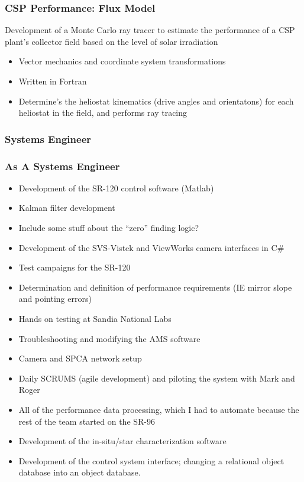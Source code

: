\documentclass[aspectratio=169]{beamer}
\begin{document}
\begin{frame}
  \frametitle{CSP Performance: Flux Model}
  Development of a Monte Carlo ray tracer to estimate the performance
  of a CSP plant's collector field based on the level of solar
  irradiation

  \begin{itemize}
  \item Vector mechanics and coordinate system transformations
  \item Written in Fortran
  \item Determine's the heliostat kinematics (drive angles and orientatons) for each heliostat in the field, and performs ray tracing
  \end{itemize}  
\end{frame}

\subsubsection{Systems Engineer}
\begin{frame}
  \frametitle{As A Systems Engineer}
  \begin{itemize}
  \item Development of the SR-120 control software (Matlab)
  \item Kalman filter development
  \item Include some stuff about the ``zero'' finding logic?
  \item Development of the SVS-Vistek and ViewWorks camera interfaces
    in C\#
  \item Test campaigns for the SR-120
  \item Determination and definition of performance requirements (IE
    mirror slope and pointing errors)
  \item Hands on testing at Sandia National Labs
  \item Troubleshooting and modifying the AMS software
  \item Camera and SPCA network setup
  \item Daily SCRUMS (agile development) and piloting the system with
    Mark and Roger
  \item All of the performance data processing, which I had to
    automate because the rest of the team started on the SR-96
  \item Development of the in-situ/star characterization software
  \item Development of the control system interface; changing a
    relational object database into an object database.
  \end{itemize}
\end{frame}
\end{document}
